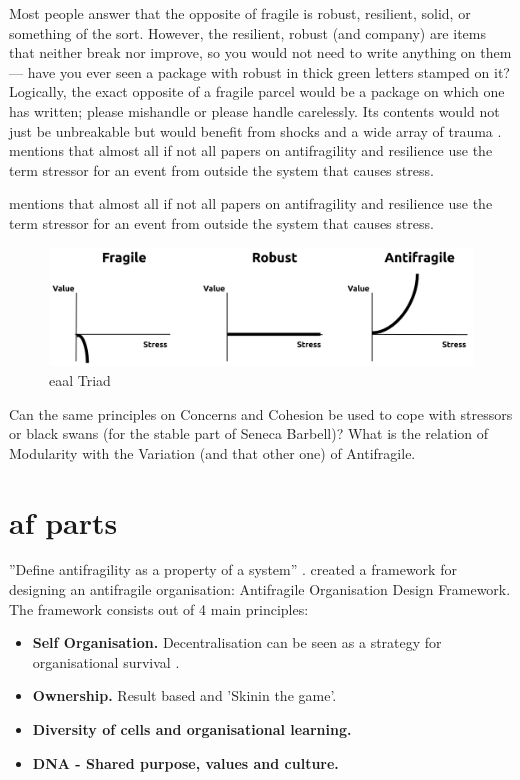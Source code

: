 Most people answer that the opposite of \gls{fragile} is \gls{robust}, \gls{resilient}, solid, or something of the sort. However, the \gls{resilient}, \gls{robust} (and company) are items that neither break nor improve, so you would not need to write anything on them — have you ever seen a package with \gls{robust} in thick green letters stamped on it? Logically, the exact opposite of a \gls{fragile} parcel would be a package on which one has written; please mishandle or please handle carelessly. Its contents would not just be unbreakable but would benefit from shocks and a wide array of trauma \parencite{Taleb2012}. \textcite[p. 32]{Botjes2020} mentions that almost all if not all papers on antifragility and resilience use the term stressor for an event from outside the system that causes stress.



\textcite[p. 32]{Botjes2020} mentions that almost all if not all papers on antifragility and resilience use the term stressor for an event from outside the system that causes stress. 

\begin{figure}[h!]
	\centering
	\includegraphics[width=0.7\linewidth]{images/eaal-triad}
	\caption[EAAL Triad]{\acrfull{eaal} Triad \parencite{Botjes2020}}
	\label{fig:eaal-triad}
\end{figure}


\begin{remark}
	Can the same principles on Concerns and Cohesion be used to cope with stressors or black swans (for the stable part of Seneca Barbell)? What is the relation of Modularity with the Variation (and that other one) of Antifragile.
\end{remark}

\section{af parts}


''Define antifragility as a property of a system'' \parencite{Jaaron2014}. \textcite{Kastner2017} created a framework for designing an antifragile organisation: Antifragile Organisation Design Framework. The framework consists out of 4 main principles:
\begin{itemize}
	\item{\textbf{Self Organisation.} Decentralisation can be seen as a strategy for organisational survival \parencite{Brafman2007}.}
	\item{\textbf{Ownership.} Result based and 'Skinin the game'.}
	\item{\textbf{Diversity of cells and organisational learning.}}
	\item{\textbf{DNA - Shared purpose, values and culture.}}
\end{itemize}

